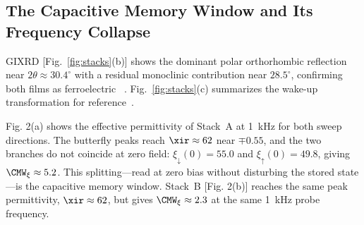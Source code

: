 \subsection{The Capacitive Memory Window and Its Frequency Collapse}
GIXRD [Fig.~\ref{fig:stacks}(b)] shows the dominant polar orthorhombic
reflection near $2\theta \approx 30.4^\circ$ with a residual monoclinic
contribution near $28.5^\circ$, confirming both films as ferroelectric
\hzo{}~\cite{boscke2011,muller2012,iung2025}. Fig.~\ref{fig:stacks}(c)
summarizes the wake-up transformation for
reference~\cite{pesic2016,schenk2014,grimley2016,cho2024wakeup}.

Fig. 2(a) shows the effective permittivity of Stack~A at
1~kHz for both sweep directions. The butterfly peaks reach
$\xir \approx 62$ near $\mp0.55$\MVcm{}, and the two branches do not coincide
at zero field: $\xi_\downarrow(0) = 55.0$ and $\xi_\uparrow(0) = 49.8$,
giving $\CMW_\xi \approx 5.2$. This splitting---read at zero bias without
disturbing the stored state---is the capacitive memory window. Stack~B
[Fig. 2(b)] reaches the same peak permittivity,
$\xir \approx 62$, but gives $\CMW_\xi \approx 2.3$ at the same 1~kHz probe
frequency.

